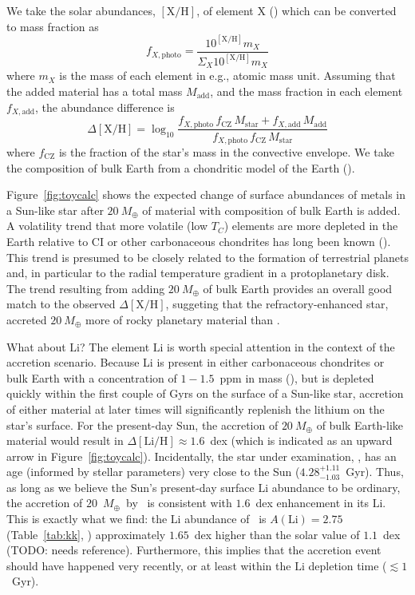 \documentclass[modern, letterpaper]{aastex61}
\newcommand{\figname}{Figure}
\newcommand*\elem[1]{\ensuremath{\mathrm{#1}}}
\newcommand*\elemH[1]{\ensuremath{[\mathrm{#1}/\elem{H}]}}
\newcommand{\sunanalog}{\text{Krios}}
\newcommand{\bizarreone}{\text{Kronos}}
\newcommand{\Tcondens}{\ensuremath{T_C}}
\newcommand{\mearth}{\ensuremath{M_\oplus}}
\newcommand{\todo}[1]{{\color{blue}TODO: #1}}
\begin{document}
We take the solar abundances, $\elemH{X}$, of element \elem{X}
(\citealt{Asplund:2009aa}) which can be converted to mass fraction as
\begin{equation}
  f_{X,\mathrm{photo}} = \frac{10^{\elemH{X}} m_X}{\Sigma_X 10^{\elemH{X}} m_X}
\end{equation}
where $m_X$ is the mass of each element in e.g., atomic mass unit.
Assuming that the added material has a total mass $M_\mathrm{add}$, and the
mass fraction in each element $f_{X,\mathrm{add}}$,
the abundance difference is
\begin{equation}
  \Delta\elemH{X} = \log_{10} \frac{f_{X,\mathrm{photo}}\,f_\mathrm{CZ}\,M_\mathrm{star}
    + f_{X,\mathrm{add}}\,M_\mathrm{add}}
    {f_{X,\mathrm{photo}}\,f_\mathrm{CZ}\,M_\mathrm{star}}
\end{equation}
where $f_\mathrm{CZ}$ is the fraction of the star's mass in the convective envelope.
We take the composition of bulk Earth from a chondritic model of the Earth
(\citealt{mcdonough2001composition}).

Figure~\ref{fig:toycalc} shows the expected change of surface abundances of
metals in a Sun-like star after $20~\mearth$ of material with composition of
bulk Earth is added.
A volatility trend that more volatile (low \Tcondens) elements are more
depleted in the Earth relative to CI or other carbonaceous chondrites
has long been known (\citealt{mcdonough2001composition}).
This trend is presumed to be closely related to the formation of terrestrial
planets and, in particular to the radial temperature gradient in a
protoplanetary disk.
The trend resulting from adding $20~\mearth$ of bulk Earth
provides an overall good match to the observed $\Delta\elemH{X}$,
suggeting that the refractory-enhanced star, \bizarreone\,
accreted $20~\mearth$ more of rocky planetary material than \sunanalog.

What about \elem{Li}?
The element \elem{Li} is worth special attention in the context of the
accretion scenario.
Because Li is present in either carbonaceous chondrites or bulk Earth with
a concentration of $1-1.5$~ppm in mass (\citealt{mcdonough2001composition}),
but is depleted quickly within the first couple of Gyrs on the surface of a
Sun-like star, accretion of either material at later times will significantly
replenish the lithium on the star's surface.
For the present-day Sun, the accretion of $20~\mearth$ of bulk Earth-like
material would result in $\Delta\elemH{Li} \approx 1.6$~dex (which
is indicated as an upward arrow in \figname~\ref{fig:toycalc}).
Incidentally, the star under examination, \bizarreone, has an age (informed by
stellar parameters) very close to the Sun ($4.28_{-1.03}^{+1.11}$~Gyr).
Thus, as long as we believe the Sun's present-day surface \elem{Li} abundance
to be ordinary, the accretion of $20$~\mearth\ by \bizarreone\ is consistent with $1.6$~dex
enhancement in its \elem{Li}.
This is exactly what we find: the \elem{Li} abundance of \bizarreone\ is
$A(\elem{Li}) = 2.75$ (Table~\ref{tab:kk}, \citealt{jmlithium})
approximately $1.65$~dex higher than the solar value of $1.1$~dex
(\todo{needs reference}).
Furthermore, this implies that the accretion event should have happened very
recently, or at least within the \elem{Li} depletion time ($\lesssim 1$~Gyr).
\end{document}

